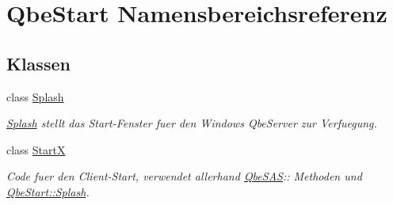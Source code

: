 \hypertarget{namespaceQbeStart}{
\section{Qbe\-Start Namensbereichsreferenz}
\label{namespaceQbeStart}
}




\subsection*{Klassen}
\begin{CompactItemize}
\item 
class \hyperlink{classQbeStart_1_1Splash}{Splash}
\begin{CompactList}\small\item\em \hyperlink{classQbeStart_1_1Splash}{Splash} stellt das Start-Fenster fuer den Windows Qbe\-Server zur Verfuegung. \item\end{CompactList}\item 
class \hyperlink{classQbeStart_1_1StartX}{Start\-X}
\begin{CompactList}\small\item\em Code fuer den Client-Start, verwendet allerhand \hyperlink{namespaceQbeSAS}{Qbe\-SAS}:: Methoden und \hyperlink{classQbeStart_1_1Splash}{Qbe\-Start::Splash}. \item\end{CompactList}\end{CompactItemize}
